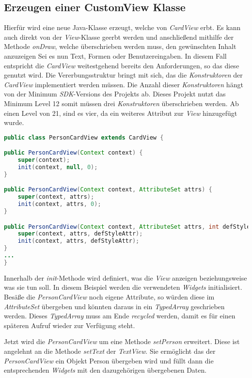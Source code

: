 \subsection{Erzeugen einer CustomView Klasse}

Hierfür wird eine neue Java-Klasse erzeugt, welche von \textit{CardView} erbt. Es kann auch direkt von der \textit{View}-Klasse geerbt werden und anschließend mithilfe der Methode \textit{onDraw}, welche überschrieben werden muss, den gewünschten Inhalt anzuzeigen Sei es nun Text, Formen oder Benutzereingaben.
In diesem Fall entspricht die \textit{CardView} weitestgehend bereits den Anforderungen, so das diese genutzt wird.
Die Vererbungsstruktur bringt mit sich, das die \textit{Konstruktoren} der \textit{CardView} implementiert werden müssen.
Die Anzahl dieser \textit{Konstruktoren} hängt von der Minimum \textit{SDK}-Versions des Projekts ab. Dieses Projekt nutzt das Minimum Level 12 somit müssen drei \textit{Konstruktoren} überschrieben werden. Ab einen Level von 21, sind es vier, da ein weiteres Attribut zur \textit{View} hinzugefügt wurde.

\begin{lstlisting}[label=lst:personCardView,
language=java,
firstnumber=1,
caption=\textit{Konstruktoren} der \textit{PersonCardView}]				  
public class PersonCardView extends CardView {

public PersonCardView(Context context) {
	super(context);
	init(context, null, 0);
}

public PersonCardView(Context context, AttributeSet attrs) {
	super(context, attrs);
	init(context, attrs, 0);
}

public PersonCardView(Context context, AttributeSet attrs, int defStyleAttr) {
	super(context, attrs, defStyleAttr);
	init(context, attrs, defStyleAttr);
}
...
}
\end{lstlisting}

Innerhalb der \textit{init}-Methode wird definiert, was die \textit{View} anzeigen beziehungsweise was sie tun soll. 
In diesem Beispiel werden die verwendeten \textit{Widgets} initialisiert. Besäße die \textit{PersonCardView} noch eigene Attribute, so würden diese im \textit{AttributeSet} übergeben und könnten daraus in ein \textit{TypedArray} geschrieben werden. Dieses \textit{TypedArray} muss am Ende \textit{recycled} werden, damit es für einen späteren Aufruf wieder zur Verfügung steht.

\newpage
Jetzt wird die \textit{PersonCardView} um eine Methode \textit{setPerson} erweitert. Diese ist angelehnt an die Methode \textit{setText} der \textit{TextView}. Sie ermöglicht das der \textit{PersonCardView} ein Objekt Person übergeben wird und füllt dann die entsprechenden \textit{Widgets} mit den dazugehörigen übergebenen Daten.

